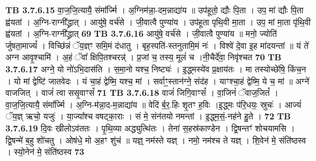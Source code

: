 \documentclass[17pt]{extarticle}
\begin{document}
{{{{{{{{{{{{{{{{{{{                  \newline
                                \textbf{ TB 3.7.6.15} \newline
                  वा॒ज॒जि॒त्यायै॒ संमा᳚र्ज्मि । अ॒ग्निम॑न्ना॒-दम॒न्नाद्या॑य ॥ उप॑हूतो॒ द्यौः पि॒ता । उप॒ मां द्यौः पि॒ता ह्व॑यतां । अ॒ग्नि-राग्नी᳚द्ध्रात् । आयु॑षे॒ वर्च॑से । जी॒वात्वै पुण्या॑य । उप॑हूता पृथि॒वी मा॒ता । उप॒ मां मा॒ता पृ॑थि॒वी ह्व॑यतां । अ॒ग्नि-राग्नी᳚द्ध्रात् \textbf{ 69} \newline
                  \newline
                                \textbf{ TB 3.7.6.16} \newline
                  आयु॑षे॒ वर्च॑से । जी॒वात्वै पुण्या॑य ॥ मनो॒ ज्योति॑ र्जुषता॒माज्यं᳚ । विच्छि॑न्नं ॅय॒ज्ञ्ꣳ समि॒मं द॑धातु । बृह॒स्पति॑-स्तनुतामि॒मं नः॑ । विश्वे॑ दे॒वा इ॒ह मा॑दयन्तां ॥ यं ते॑ अग्न आवृ॒श्चामि॑ । अ॒हं ॅवा᳚ क्षिपि॒तश्चरन्न्॑ । प्र॒जां च॒ तस्य॒ मूलं॑ च ।नी॒चैर्दे॑वा॒ निवृ॑श्चत \textbf{ 70} \newline
                  \newline
                                \textbf{ TB 3.7.6.17} \newline
                  अग्ने॒ यो नो॑ऽभि॒दास॑ति । स॒मा॒नो यश्च॒ निष्ट्यः॑ । इ॒द्ध्मस्ये॑व प्र॒क्षाय॑तः । मा तस्योच्छे॑षि॒ किंच॒न । यो मां द्वेष्टि॑ जातवेदः । यं चा॒हं द्वेष्मि॒ यश्च॒ मां । सर्वाꣳ॒॒स्तान॑ग्ने॒ संद॑ह । याꣳश्चा॒हं द्वेष्मि॒ ये च॒ मां ॥ अग्ने॑ वाजजित् । वाजं॑ त्वा ससृ॒वाꣳसं᳚ \textbf{ 71} \newline
                  \newline
                                \textbf{ TB 3.7.6.18} \newline
                  वाजं॑ जिगि॒वाꣳसं᳚ । वा॒जिनं॑ ॅवाज॒जितं᳚ । वा॒ज॒जि॒त्यायै॒ संमा᳚र्ज्मि । अ॒ग्नि-म॑न्ना॒द-म॒न्नाद्या॑य ॥ वेदि॑ र्ब॒र॒.हिः शृ॒तꣳ ह॒विः ।इ॒द्ध्मः प॑रि॒धयः॒ स्रुचः॑ । आज्यं॑ ॅय॒ज्ञ् ऋचो॒ यजुः॑ । या॒ज्या᳚श्च वषट्का॒राः । सं मे॒ संन॑तयो नमन्तां । इ॒द्ध्म॒सं॒-नह॑ने हु॒ते । \textbf{ 72} \newline
                  \newline
                                \textbf{ TB 3.7.6.19} \newline
                  दि॒वः खीलोऽव॑ततः । पृ॒थि॒व्या अद्ध्युत्थि॑तः । तेना॑ स॒हस्र॑काण्डेन । द्वि॒षन्तꣳ॑ शोचयामसि । द्वि॒षन्मे॑ ब॒हु शो॑चतु । ओष॑धे॒ मो अ॒हꣳ शु॑चं ॥ यज्ञ्॒ नम॑स्ते यज्ञ् । नमो॒ नम॑श्च ते यज्ञ् । शि॒वेन॑ मे॒ संति॑ष्ठस्व । स्यो॒नेन॑ मे॒ संति॑ष्ठस्व \textbf{ 73} \newline
                  \newline
}}}}}}}}}}}}}}}}}}}
\end{document}
